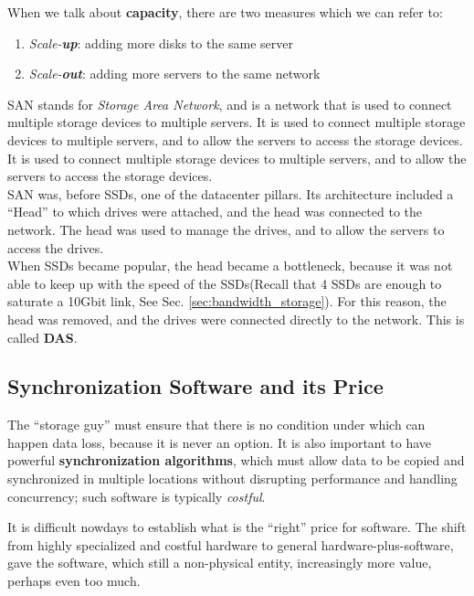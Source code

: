 
When we talk about \textbf{capacity}, there are two measures which we can refer to:
\begin{enumerate}
   \item \textit{Scale-\textbf{up}}:
   adding more disks to the same server
   \item \textit{Scale-\textbf{out}}:
   adding more servers to the same network
\end{enumerate}

SAN stands for \textit{Storage Area Network}, and is a network that is used to connect multiple storage devices to multiple servers. It is used to connect multiple storage devices to multiple servers, and to allow the servers to access the storage devices. It is used to connect multiple storage devices to multiple servers, and to allow the servers to access the storage devices.\\
SAN was, before SSDs, one of the datacenter pillars.
Its architecture included a ``Head'' to which drives were attached, and the head was connected to the network. The head was used to manage the drives, and to allow the servers to access the drives.\\
When SSDs became popular, the head became a bottleneck, because it was not able to keep up with the speed of the SSDs(Recall that 4 SSDs are enough to saturate a 10Gbit link, See Sec. \ref{sec:bandwidth_storage}). For this reason, the head was removed, and the drives were connected directly to the network. This is called \textbf{DAS}. 

\subsection{Synchronization Software and its Price}

The ``storage guy'' must ensure that there is no condition under which can happen data loss, because it is never an option. It is also important to have powerful \textbf{synchronization algorithms}, which must allow data to be copied and synchronized in multiple locations without disrupting performance and handling concurrency;
such software is typically \textit{costful}.

It is difficult nowdays to establish what is the ``right'' price for software. The shift from highly specialized and costful hardware to general hardware-plus-software, gave the software, which still a non-physical entity, increasingly more value, perhaps even too much.

